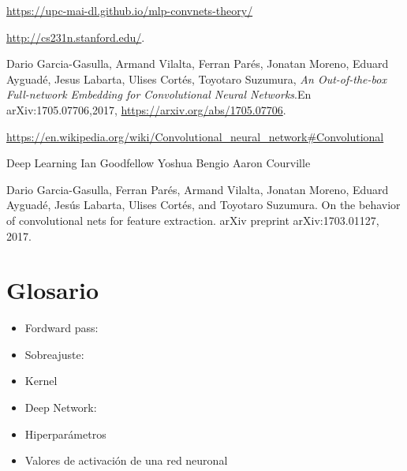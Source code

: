 \documentclass[12,twoside]{TFG-GM}
\theoremstyle{definition}
\theoremstyle{remark}
\begin{document}
\newpage

\begin{thebibliography}{9}
\url{https://upc-mai-dl.github.io/mlp-convnets-theory/}

\url{http://cs231n.stanford.edu/}. 

Dario Garcia-Gasulla, Armand Vilalta, Ferran Parés, Jonatan Moreno, Eduard Ayguadé, Jesus Labarta, Ulises Cortés, Toyotaro Suzumura, 
\textit{An Out-of-the-box Full-network Embedding for
Convolutional Neural Networks}.En arXiv:1705.07706,2017, \url{https://arxiv.org/abs/1705.07706}. 


\url{https://en.wikipedia.org/wiki/Convolutional_neural_network#Convolutional}

Deep Learning
Ian Goodfellow
Yoshua Bengio
Aaron Courville


Dario Garcia-Gasulla, Ferran Parés, Armand Vilalta, Jonatan Moreno, Eduard Ayguadé, Jesús
Labarta, Ulises Cortés, and Toyotaro Suzumura. On the behavior of convolutional nets for
feature extraction. arXiv preprint arXiv:1703.01127, 2017.

\end{thebibliography}
\appendix
\vfill\newpage 
\section{Glosario}
\begin{itemize}
\item Fordward pass: 
\item Sobreajuste: 
\item Kernel
\item Deep Network:
\item Hiperparámetros
\item Valores de activación de una red neuronal
\end{itemize}
\end{document}
